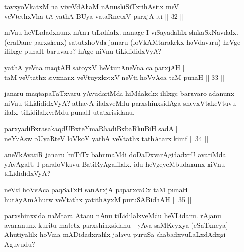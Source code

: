 
\begin{shl}
tavxyoVkatxM na viveVdAhaM nAnushiSiTxrihAsitx meV | \\
veVtethxVha tA yathA BUya vataRnetxV parxjA iti  \hfill|| 32 || 
\end{shl}

\begin{artha}
niVnu heVLidadxnunx nAnu tiLidilalx. nanage I viSayadalilx 
shikaSxNavilalx. (eraDane parxshenx) satutxhoVda janaru 
(loVkAMtarakekx hoVdavaru) heVge ililxge punaH baruvaro? hAge niVnu 
tiLidididxVyA?
\end{artha}


\begin{shl}
yathA yeVna maqtAH satoyxV heVtunA\s neVna ca parxjAH | \\
taM veVtathx sivxnanx veVtuyxkotxV neVti hoVvAca taM punaH \hfill|| 33 || 
\end{shl}

\begin{artha}
janaru maqtapaTaTxvaru yAvudariMda hiMdakekx ililxge baruvaro adanunx 
niVnu tiLidididxVyA? athavA ilalxveMdu parxshinxsidAga shevxVtakeVtuvu 
ilalx, tiLidilalxveMdu punaH utatxrisidanu.
\end{artha}


\begin{shl}
parxyadiBxrasakaqdUBxteYmaRhadiBxbaRhuBiH sadA | \\
neYvAsw pUyaRteV loVkoV yathA veVtathx tathA\s tarx kimf \hfill|| 34 || 
\end{shl}

\begin{artha}
aneVkAvatiR janaru huTiTx bahumaMdi doDaDxvarAgidadxrU avariMda 
yAvAgalU I paraloVkavu BatiRyAgalilalx. idu heVgeyeMbudanunx niVnu 
tiLidididxVyA?
\end{artha}


\begin{shl}
neVti hoVvAca paqSaTxH sanArxjA paparxcaCx taM punaH | \\
hutAyAmAhutw veVtathx yatithAyxM puruSABidhAH \hfill|| 35 || 
\end{shl}

\begin{artha}
parxshinxsida naMtara Atanu nAnu tiLidilalxveMdu heVLidanu. rAjanu 
avananunx kuritu matetx parxshinxsidanu - yAva saMKeyxya (eSaTxneya) 
Ahutiyalilx hoVma mADidadxralilx jalavu puruSa shabadxvuLaLxdAdxgi 
Aguvudu?
\end{artha}

